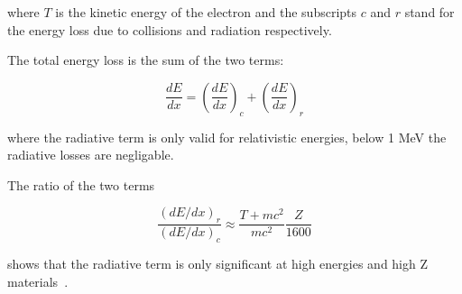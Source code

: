 \documentclass[cnatzke_thesis_proposal.tex]{subfiles}
\begin{document}
where $T$ is the kinetic energy of the electron and the subscripts $c$ and $r$ stand for the energy loss due to collisions and radiation respectively. 

The total energy loss is the sum of the two terms: 

\begin{equation}
    \frac{dE}{dx} = \left(\frac{dE}{dx}\right)_c + \left(\frac{dE}{dx}\right)_r 
\end{equation}

where the radiative term is only valid for relativistic energies, below 1 MeV the radiative losses are negligable.

The ratio of the two terms 

\begin{equation}
    \frac{(dE/dx)_r}{(dE/dx)_c} \approx \frac{T + mc^2}{mc^2} \frac{Z}{1600}
\end{equation}

shows that the radiative term is only significant at high energies and high Z materials~\cite{krane_introductory_1987}.

\end{document}
